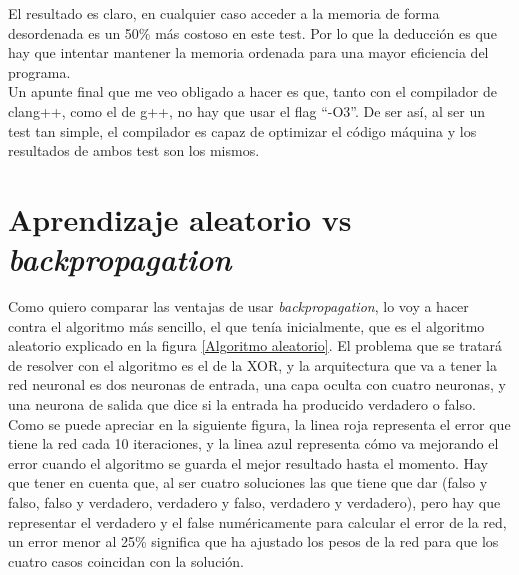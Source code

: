 El resultado es claro, en cualquier caso acceder a la memoria de forma desordenada es un 50\% más costoso en este test. Por lo que la deducción es que hay que intentar mantener la memoria ordenada para una mayor eficiencia del programa. 
\\
Un apunte final que me veo obligado a hacer es que, tanto con el compilador de clang++, como el de g++, no hay que usar el flag ``-O3''. De ser así, al ser un test tan simple, el compilador es capaz de optimizar el código máquina y los resultados de ambos test son los mismos.

\section{Aprendizaje aleatorio vs \textit{backpropagation}}
\label{aleatorio vs backpropagation resultados}
Como quiero comparar las ventajas de usar \textit{backpropagation}, lo voy a hacer contra el algoritmo más sencillo, el que tenía inicialmente, que es el algoritmo aleatorio explicado en la figura \ref{Algoritmo aleatorio}. El problema que se tratará de resolver con el algoritmo es el de la XOR, y la arquitectura que va a tener la red neuronal es dos neuronas de entrada, una capa oculta con cuatro neuronas, y una neurona de salida que dice si la entrada ha producido verdadero o falso. 
\\
Como se puede apreciar en la siguiente figura, la linea roja representa el error que tiene la red cada 10 iteraciones, y la linea azul representa cómo va mejorando el error cuando el algoritmo se guarda el mejor resultado hasta el momento. Hay que tener en cuenta que, al ser cuatro soluciones las que tiene que dar (falso y falso, falso y verdadero, verdadero y falso, verdadero y verdadero), pero hay que representar el verdadero y el false numéricamente para calcular el error de la red, un error menor al 25\% significa que ha ajustado los pesos de la red para que los cuatro casos coincidan con la solución.
